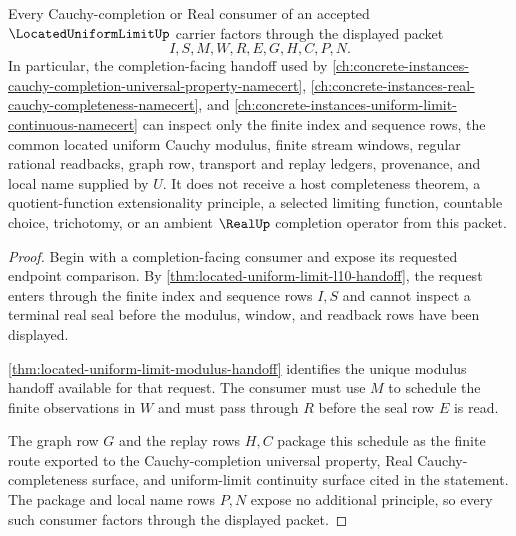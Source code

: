 \begin{theorem}
\label{thm:located-uniform-limit-cauchy-completion-factorization}
Every Cauchy-completion or Real consumer of an accepted
$\LocatedUniformLimitUp$ carrier factors through the displayed packet
$$
I,S,M,W,R,E,G,H,C,P,N .
$$
In particular, the completion-facing handoff used by
\autoref{ch:concrete-instances-cauchy-completion-universal-property-namecert},
\autoref{ch:concrete-instances-real-cauchy-completeness-namecert}, and
\autoref{ch:concrete-instances-uniform-limit-continuous-namecert} can inspect
only the finite index and sequence rows, the common located uniform Cauchy
modulus, finite stream windows, regular rational readbacks, graph row,
transport and replay ledgers, provenance, and local name supplied by $U$.
It does not receive a host completeness theorem, a quotient-function
extensionality principle, a selected limiting function, countable choice,
trichotomy, or an ambient $\RealUp$ completion operator from this packet.
\end{theorem}
\begin{proof}
Begin with a completion-facing consumer and expose its requested endpoint
comparison. By \autoref{thm:located-uniform-limit-l10-handoff}, the request
enters through the finite index and sequence rows $I,S$ and cannot inspect a
terminal real seal before the modulus, window, and readback rows have been
displayed.

\autoref{thm:located-uniform-limit-modulus-handoff} identifies the unique
modulus handoff available for that request. The consumer must use $M$ to
schedule the finite observations in $W$ and must pass through $R$ before the
seal row $E$ is read.

The graph row $G$ and the replay rows $H,C$ package this schedule as the
finite route exported to the Cauchy-completion universal property, Real
Cauchy-completeness surface, and uniform-limit continuity surface cited in
the statement. The package and local name rows $P,N$ expose no additional
principle, so every such consumer factors through the displayed packet.
\end{proof}

